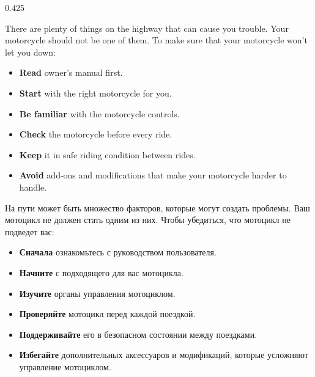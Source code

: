 

\begin{langblock}{0.425}
\begin{eng}	
	There are plenty of things on the highway that can cause you trouble. Your motorcycle should not be one of them. To make sure that your motorcycle won't let you down:
	\begin{itemize}[noitemsep]
		\item \textbf{Read} owner's manual first.
		\item \textbf{Start} with the right motorcycle for you.
		\item \textbf{Be familiar} with the motorcycle controls.
		\item \textbf{Check} the motorcycle before every ride.
		\item \textbf{Keep} it in safe riding condition between rides.
		\item \textbf{Avoid} add-ons and modifications that make your motorcycle harder to handle.
	\end{itemize}
\end{eng}
\begin{rus}
		На пути может быть множество факторов, которые могут создать проблемы. Ваш мотоцикл не должен стать одним из них. Чтобы убедиться, что мотоцикл не подведет вас:
		\begin{itemize}[noitemsep]
			\item \textbf{Сначала} ознакомьтесь с руководством пользователя.
			\item \textbf{Начните} с подходящего для вас мотоцикла.
			\item \textbf{Изучите} органы управления мотоциклом.
			\item \textbf{Проверяйте} мотоцикл перед каждой поездкой.
			\item \textbf{Поддерживайте} его в безопасном состоянии между поездками.
			\item \textbf{Избегайте} дополнительных аксессуаров и модификаций, которые усложняют управление мотоциклом.
		\end{itemize}
\end{rus}
\end{langblock}











